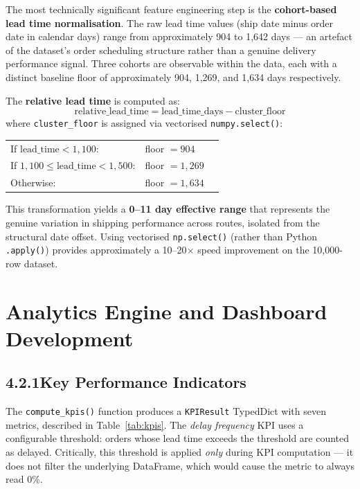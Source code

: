\documentclass[12pt, a4paper]{report}
\begin{document}
The most technically significant feature engineering step is the
\textbf{cohort-based lead time normalisation}. The raw lead time values
(ship date minus order date in calendar days) range from approximately
904 to 1{,}642 days — an artefact of the dataset's order scheduling
structure rather than a genuine delivery performance signal. Three
cohorts are observable within the data, each with a distinct baseline
floor of approximately 904, 1{,}269, and 1{,}634 days respectively.

The \textbf{relative lead time} is computed as:
\[
  \text{relative\_lead\_time} = \text{lead\_time\_days} - \text{cluster\_floor}
\]
where \texttt{cluster\_floor} is assigned via vectorised \texttt{numpy.select()}:
\begin{center}
  \begin{tabular}{@{}lll@{}}
    If $\text{lead\_time} < 1{,}100$: & floor $= 904$ \\
    If $1{,}100 \leq \text{lead\_time} < 1{,}500$: & floor $= 1{,}269$ \\
    Otherwise: & floor $= 1{,}634$ \\
  \end{tabular}
\end{center}

This transformation yields a \textbf{0--11 day effective range} that
represents the genuine variation in shipping performance across routes,
isolated from the structural date offset. Using vectorised
\texttt{np.select()} (rather than Python \texttt{.apply()}) provides
approximately a 10--20$\times$ speed improvement on the 10{,}000-row dataset.

\section{Analytics Engine and Dashboard Development}

\subsection*{4.2.1\quad Key Performance Indicators}

The \texttt{compute\_kpis()} function produces a \texttt{KPIResult}
TypedDict with seven metrics, described in Table~\ref{tab:kpis}. The
\emph{delay frequency} KPI uses a configurable threshold: orders whose
lead time exceeds the threshold are counted as delayed. Critically, this
threshold is applied \emph{only} during KPI computation — it does not
filter the underlying DataFrame, which would cause the metric to always
read 0\%.
\end{document}
